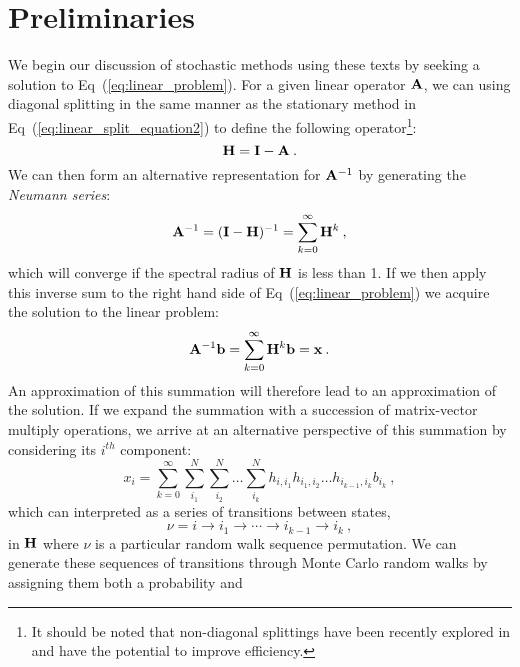 \section{Preliminaries}
\label{sec:mc_preliminaries}
We begin our discussion of stochastic methods using these texts by
seeking a solution to Eq~(\ref{eq:linear_problem}). For a given linear
operator $\mathbf{A}$, we can using diagonal splitting in the same manner
as the stationary method in Eq~(\ref{eq:linear_split_equation2}) to
define the following operator\footnote{It should be noted that
  non-diagonal splittings have been recently explored in
  \citep{srinivasan_monte_2010} and have the potential to improve
  efficiency.}:
\begin{equation}
  \mathbf{H} = \mathbf{I} - \mathbf{A}\:.
  \label{eq:linear_mc_iteration_matrix}
\end{equation}
We can then form an alternative representation for $\mathbf{A}^{-1}$ by
generating the \textit{Neumann series}:
\begin{equation}
  \mathbf{A}^{-1} = (\mathbf{I}-\mathbf{H})^{-1} = \sum_{k=0}^{\infty} \mathbf{H}^k\:,
  \label{eq:neumann_series}
\end{equation}
which will converge if the spectral radius of $\mathbf{H}$ is less than
1. If we then apply this inverse sum to the right hand side of
Eq~(\ref{eq:linear_problem}) we acquire the solution to the linear
problem:
\begin{equation}
  \mathbf{A}^{-1}\mathbf{b} = \sum_{k=0}^{\infty} \mathbf{H}^k\mathbf{b} = \mathbf{x}\:.
  \label{eq:neumann_solution}
\end{equation}
An approximation of this summation will therefore lead to an
approximation of the solution. If we expand the summation with a
succession of matrix-vector multiply operations, we arrive at an
alternative perspective of this summation by considering its $i^{th}$
component:
\begin{equation}
  x_i = \sum_{k=0}^{\infty}\sum_{i_1}^{N}\sum_{i_2}^{N}\ldots
  \sum_{i_k}^{N}h_{i,i_1}h_{i_1,i_2}\ldots h_{i_{k-1},i_k}b_{i_k}\:,
  \label{eq:expanded_neumann_solution}
\end{equation}
which can interpreted as a series of transitions between states,
\begin{equation}
 \nu = i \rightarrow i_1 \rightarrow \cdots \rightarrow i_{k-1}
 \rightarrow i_{k}\:,
  \label{eq:mc_walk_permutation}
\end{equation}
in $\mathbf{H}$ where $\nu$ is a particular random walk sequence
permutation. We can generate these sequences of transitions through
Monte Carlo random walks by assigning them both a probability and
